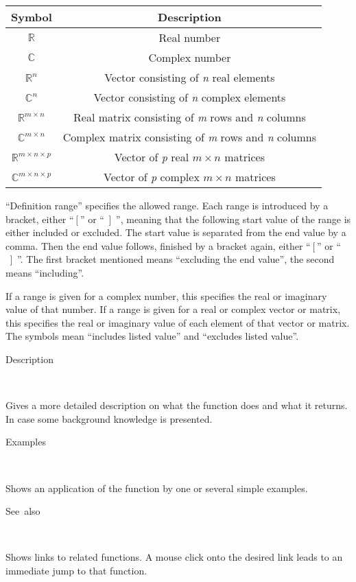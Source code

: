 \begin{tabular}{|c|c|}
\hline 
Symbol&
Description\tabularnewline
\hline
\hline 
$\mathbb{R}$&
Real number\tabularnewline
\hline 
$\mathbb{C}$&
Complex number\tabularnewline
\hline 
$\mathbb{R}^{n}$&
Vector consisting of \textit{n} real elements\tabularnewline
\hline 
$\mathbb{C}^{n}$&
Vector consisting of \textit{n} complex elements\tabularnewline
\hline
$\mathbb{R}^{m\times n}$&
Real matrix consisting of \textit{m} rows and \textit{n} columns\tabularnewline
\hline
$\mathbb{\mathbb{C}}^{m\times n}$&
Complex matrix consisting of \textit{m} rows and \textit{n} columns\tabularnewline
\hline
$\mathbb{R}^{m\times n\times p}$&
Vector of \textit{p} real $m\times n$ matrices\tabularnewline
\hline
$\mathbb{\mathbb{C}}^{m\times n\times p}$&
Vector of \textit{p} complex $m\times n$ matrices\tabularnewline
\hline
\end{tabular}

\medskip{}
{}``Definition range'' specifies the allowed range. Each range is
introduced by a bracket, either {}``$\left[\right.$'' or {}``$\left]\right.$'',
meaning that the following start value of the range is either included
or excluded. The start value is separated from the end value by a
comma. Then the end value follows, finished by a bracket again, either
{}``$\left[\right.$'' or {}``$\left]\right.$''. The first bracket
mentioned means {}``excluding the end value'', the second means
{}``including''.
\vspace{12pt}

If a range is given for a complex number, this specifies the real
or imaginary value of that number. If a range is given for a real
or complex vector or matrix, this specifies the real or imaginary
value of each element of that vector or matrix. The symbols mean {}``includes
listed value'' and {}``excludes listed value''.

\begin{description}
\item [Description]~
\end{description}
Gives a more detailed description on what the function does and what
it returns. In case some background knowledge is presented.

\begin{description}
\item [Examples]~
\end{description}
Shows an application of the function by one or several simple examples.

\begin{description}
\item [See~also]~
\end{description}
Shows links to related functions. A mouse click onto the desired link
leads to an immediate jump to that function.


